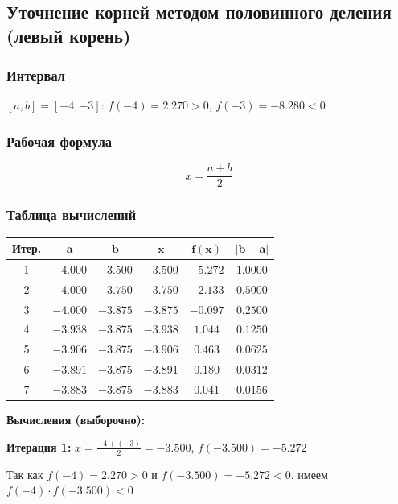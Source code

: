 \documentclass[a4paper,12pt]{article}
\begin{document}
\newpage

\subsection{Уточнение корней методом половинного деления (левый корень)}

\subsubsection*{Интервал}

$[a, b] = [-4, -3]$: $f(-4) = 2.270 > 0$, $f(-3) = -8.280 < 0$

\subsubsection*{Рабочая формула}
\[
    x = \frac{a + b}{2}
\]

\subsubsection*{Таблица вычислений}

\begin{center}
\begin{tabular}{|c|c|c|c|c|c|}
\hline
\textbf{Итер.} & $\mathbf{a}$ & $\mathbf{b}$ & $\mathbf{x}$ & $\mathbf{f(x)}$ & $\mathbf{|b-a|}$ \\
\hline
1 & $-4.000$ & $-3.500$ & $-3.500$ & $-5.272$ & $1.0000$ \\
\hline
2 & $-4.000$ & $-3.750$ & $-3.750$ & $-2.133$ & $0.5000$ \\
\hline
3 & $-4.000$ & $-3.875$ & $-3.875$ & $-0.097$ & $0.2500$ \\
\hline
4 & $-3.938$ & $-3.875$ & $-3.938$ & $1.044$ & $0.1250$ \\
\hline
5 & $-3.906$ & $-3.875$ & $-3.906$ & $0.463$ & $0.0625$ \\
\hline
6 & $-3.891$ & $-3.875$ & $-3.891$ & $0.180$ & $0.0312$ \\
\hline
7 & $-3.883$ & $-3.875$ & $-3.883$ & $0.041$ & $0.0156$ \\
\hline
\end{tabular}
\end{center}

\textbf{Вычисления (выборочно):}

\textbf{Итерация 1:} $x = \frac{-4 + (-3)}{2} = -3.500$, $f(-3.500) = -5.272$

Так как $f(-4) = 2.270 > 0$ и $f(-3.500) = -5.272 < 0$, имеем $f(-4) \cdot f(-3.500) < 0$
\end{document}
